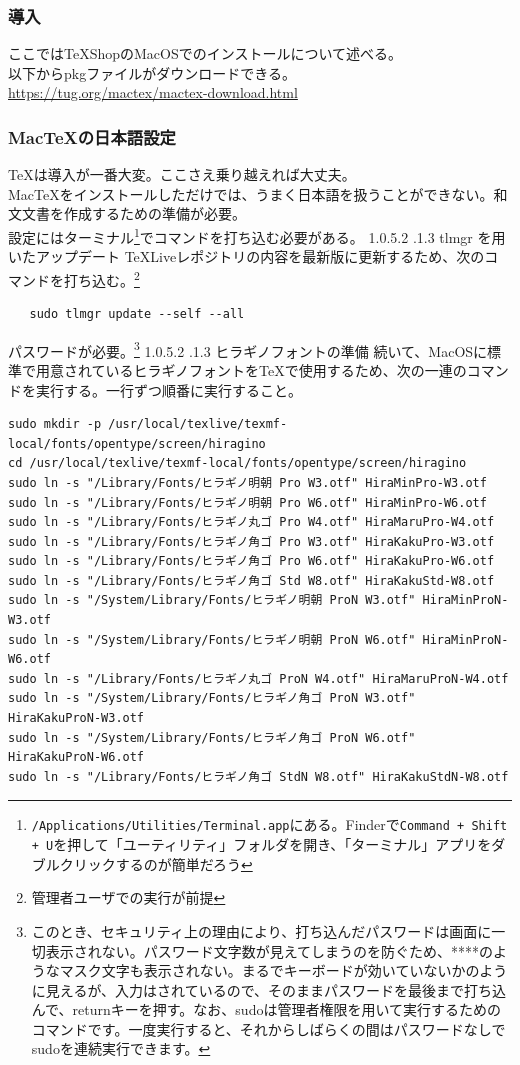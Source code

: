 \documentclass[dvipdfmx,jb5]{jarticle}
\makeatletter
\newcommand{\subsubsubsection}{\@startsection{paragraph}{4}{\z@}%
    {1.0\Cvs \@plus.5\Cdp \@minus.2\Cdp}%
    {.1\Cvs \@plus.3\Cdp}%
    {\reset@font}
  }
\makeatother
\begin{document}
  \subsubsection{導入}
  ここではTeXShopのMacOSでのインストールについて述べる。\\
  以下からpkgファイルがダウンロードできる。\\
  \url{https://tug.org/mactex/mactex-download.html}
  \subsubsection{Mac\TeX の日本語設定}
  \TeX は導入が一番大変。ここさえ乗り越えれば大丈夫。\\
  Mac\TeX をインストールしただけでは、うまく日本語を扱うことができない。和文文書を作成するための準備が必要。\\
  設定にはターミナル\footnote{\texttt{/Applications/Utilities/Terminal.app}にある。Finderで\texttt{Command + Shift + U}を押して「ユーティリティ」フォルダを開き、「ターミナル」アプリをダブルクリックするのが簡単だろう}でコマンドを打ち込む必要がある。
  \subsubsubsection{tlmgr を用いたアップデート}
  \TeX Liveレポジトリの内容を最新版に更新するため、次のコマンドを打ち込む。\footnote{管理者ユーザでの実行が前提}
  \begin{lstlisting}
   sudo tlmgr update --self --all
  \end{lstlisting}
  パスワードが必要。\footnote{このとき、セキュリティ上の理由により、打ち込んだパスワードは画面に一切表示されない。パスワード文字数が見えてしまうのを防ぐため、****のようなマスク文字も表示されない。まるでキーボードが効いていないかのように見えるが、入力はされているので、そのままパスワードを最後まで打ち込んで、returnキーを押す。なお、sudoは管理者権限を用いて実行するためのコマンドです。一度実行すると、それからしばらくの間はパスワードなしでsudoを連続実行できます。}
  \subsubsubsection{ヒラギノフォントの準備}
  続いて、MacOSに標準で用意されているヒラギノフォントを\TeX で使用するため、次の一連のコマンドを実行する。一行ずつ順番に実行すること。
  \begin{lstlisting}
sudo mkdir -p /usr/local/texlive/texmf-local/fonts/opentype/screen/hiragino
cd /usr/local/texlive/texmf-local/fonts/opentype/screen/hiragino
sudo ln -s "/Library/Fonts/ヒラギノ明朝 Pro W3.otf" HiraMinPro-W3.otf
sudo ln -s "/Library/Fonts/ヒラギノ明朝 Pro W6.otf" HiraMinPro-W6.otf
sudo ln -s "/Library/Fonts/ヒラギノ丸ゴ Pro W4.otf" HiraMaruPro-W4.otf
sudo ln -s "/Library/Fonts/ヒラギノ角ゴ Pro W3.otf" HiraKakuPro-W3.otf
sudo ln -s "/Library/Fonts/ヒラギノ角ゴ Pro W6.otf" HiraKakuPro-W6.otf
sudo ln -s "/Library/Fonts/ヒラギノ角ゴ Std W8.otf" HiraKakuStd-W8.otf
sudo ln -s "/System/Library/Fonts/ヒラギノ明朝 ProN W3.otf" HiraMinProN-W3.otf
sudo ln -s "/System/Library/Fonts/ヒラギノ明朝 ProN W6.otf" HiraMinProN-W6.otf
sudo ln -s "/Library/Fonts/ヒラギノ丸ゴ ProN W4.otf" HiraMaruProN-W4.otf
sudo ln -s "/System/Library/Fonts/ヒラギノ角ゴ ProN W3.otf" HiraKakuProN-W3.otf
sudo ln -s "/System/Library/Fonts/ヒラギノ角ゴ ProN W6.otf" HiraKakuProN-W6.otf
sudo ln -s "/Library/Fonts/ヒラギノ角ゴ StdN W8.otf" HiraKakuStdN-W8.otf
\end{lstlisting}
\end{document}
